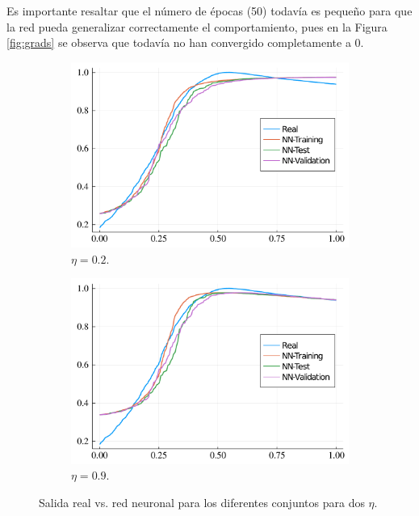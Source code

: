 \documentclass[fleqn]{article}
\begin{document}
\begin{enumerate}
    Es importante resaltar que el número de épocas (50) todavía es pequeño para que la red pueda generalizar correctamente el comportamiento, pues en la Figura \ref{fig:grads} se observa que todavía no han convergido completamente a 0.
    \begin{figure}[H]
    \centering
    \begin{subfigure}[b]{0.45\textwidth}
        \centering
        \includegraphics[width=\textwidth]{2/output.pdf}
        \caption{$\eta=0.2$.}
    \end{subfigure}
    \begin{subfigure}[b]{0.45\textwidth}  
        \centering 
        \includegraphics[width=\textwidth]{9/output.pdf}
        \caption{$\eta=0.9$.}
    \end{subfigure}
    \caption{Salida real vs. red neuronal para los diferentes conjuntos para dos $\eta$.}
    \label{fig:outs}
    \end{figure}
    

\end{enumerate}
\end{document}
